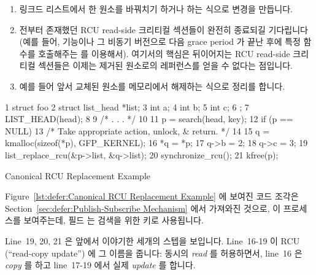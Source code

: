 \begin{enumerate}
\item	링크드 리스트에서 한 원소를 바꿔치기 하거나 하는 식으로 변경을
	만듭니다.
\item	전부터 존재했던 RCU read-side 크리티컬 섹션들이 완전히 종료되길
	기다립니다 (예를 들어,  기능이나 그 비동기
	버전으로 다음 grace period 가 끝난 후에 특정 함수를 호출해주는
	 를 이용해서).
	여기서의 핵심은 뒤이어지는 RCU read-side 크리티컬 섹션들은 이제는
	제거된 원소로의 레퍼런스를 얻을 수 없다는 점입니다.
\item	예를 들어 앞서 교체된 원소를 메모리에서 해제하는 식으로 정리를 합니다.

\end{enumerate}

\begin{listing}[tbp]
{ \scriptsize
\begin{verbbox}
  1 struct foo {
  2   struct list_head *list;
  3   int a;
  4   int b;
  5   int c;
  6 };
  7 LIST_HEAD(head);
  8
  9 /* . . . */
 10
 11 p = search(head, key);
 12 if (p == NULL) {
 13   /* Take appropriate action, unlock, & return. */
 14 }
 15 q = kmalloc(sizeof(*p), GFP_KERNEL);
 16 *q = *p;
 17 q->b = 2;
 18 q->c = 3;
 19 list_replace_rcu(&p->list, &q->list);
 20 synchronize_rcu();
 21 kfree(p);
\end{verbbox}
}
\centering
\theverbbox
\caption{Canonical RCU Replacement Example}
\label{lst:defer:Canonical RCU Replacement Example}
\end{listing}

Figure~\ref{lst:defer:Canonical RCU Replacement Example} 에 보여진 코드 조각은
Section~\ref{sec:defer:Publish-Subscribe Mechanism} 에서 가져와진 것으로, 이
프로세스를 보여주는데,  필드  는 검색을 위한 키로 사용됩니다.

Line~19, 20, 21 은 앞에서 이야기한 세개의 스텝을 보입니다.
Line~16-19 이 RCU (``read-copy update'') 에 그 이름을 줍니다: 동시의
\emph{read} 를 허용하면서, line~16 은 \emph{copy} 를 하고 line~17-19 에서 실제
\emph{update} 를 합니다.
\iffalse

